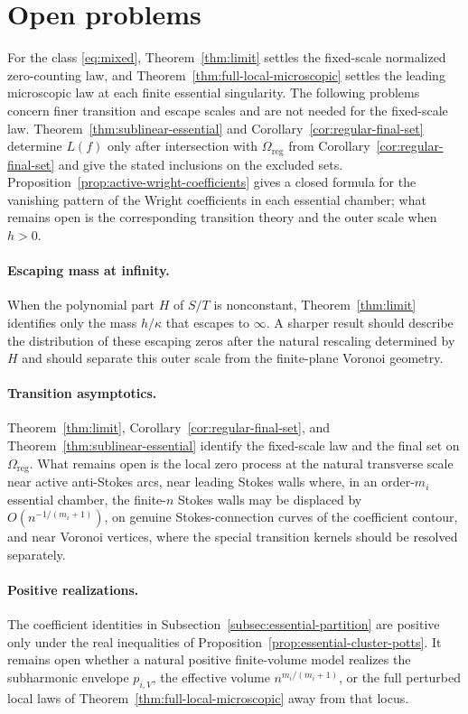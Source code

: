 \documentclass[reqno]{article}
\theoremstyle{definition}
\theoremstyle{remark}
\theoremstyle{plain}
\begin{document}
\section{Open problems}\label{sec:open}

For the class \eqref{eq:mixed}, Theorem~\ref{thm:limit} settles the fixed-scale normalized zero-counting law, and Theorem~\ref{thm:full-local-microscopic} settles the leading microscopic law at each finite essential singularity. The following problems concern finer transition and escape scales and are not needed for the fixed-scale law. Theorem~\ref{thm:sublinear-essential} and Corollary~\ref{cor:regular-final-set} determine $L(f)$ only after intersection with $\Omega_{\mathrm{reg}}$ from Corollary~\ref{cor:regular-final-set} and give the stated inclusions on the excluded sets. Proposition~\ref{prop:active-wright-coefficients} gives a closed formula for the vanishing pattern of the Wright coefficients in each essential chamber; what remains open is the corresponding transition theory and the outer scale when $h>0$.

\paragraph{Escaping mass at infinity.}
When the polynomial part $H$ of $S/T$ is nonconstant, Theorem~\ref{thm:limit} identifies only the mass $h/\kappa$ that escapes to $\infty$. A sharper result should describe the distribution of these escaping zeros after the natural rescaling determined by $H$ and should separate this outer scale from the finite-plane Voronoi geometry.

\paragraph{Transition asymptotics.}
Theorem~\ref{thm:limit}, Corollary~\ref{cor:regular-final-set}, and Theorem~\ref{thm:sublinear-essential} identify the fixed-scale law and the final set on $\Omega_{\mathrm{reg}}$. What remains open is the local zero process at the natural transverse scale near active anti-Stokes arcs, near leading Stokes walls where, in an order-$m_i$ essential chamber, the finite-$n$ Stokes walls may be displaced by $O(n^{-1/(m_i+1)})$, on genuine Stokes-connection curves of the coefficient contour, and near Voronoi vertices, where the special transition kernels should be resolved separately.

\paragraph{Positive realizations.}
The coefficient identities in Subsection~\ref{subsec:essential-partition} are positive only under the real inequalities of Proposition~\ref{prop:essential-cluster-potts}. It remains open whether a natural positive finite-volume model realizes the subharmonic envelope $p_{i,V}$, the effective volume $n^{m_i/(m_i+1)}$, or the full perturbed local laws of Theorem~\ref{thm:full-local-microscopic} away from that locus.
\end{document}
